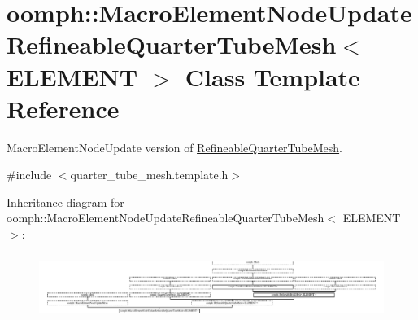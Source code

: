 \hypertarget{classoomph_1_1MacroElementNodeUpdateRefineableQuarterTubeMesh}{}\section{oomph\+:\+:Macro\+Element\+Node\+Update\+Refineable\+Quarter\+Tube\+Mesh$<$ E\+L\+E\+M\+E\+NT $>$ Class Template Reference}
\label{classoomph_1_1MacroElementNodeUpdateRefineableQuarterTubeMesh}


Macro\+Element\+Node\+Update version of \hyperlink{classoomph_1_1RefineableQuarterTubeMesh}{Refineable\+Quarter\+Tube\+Mesh}.  




{\ttfamily \#include $<$quarter\+\_\+tube\+\_\+mesh.\+template.\+h$>$}

Inheritance diagram for oomph\+:\+:Macro\+Element\+Node\+Update\+Refineable\+Quarter\+Tube\+Mesh$<$ E\+L\+E\+M\+E\+NT $>$\+:\begin{figure}[H]
\begin{center}
\leavevmode
\includegraphics[height=2.139738cm]{classoomph_1_1MacroElementNodeUpdateRefineableQuarterTubeMesh}
\end{center}
\end{figure}
